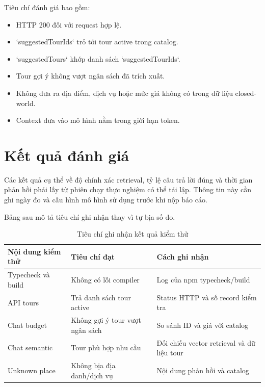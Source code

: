 Tiêu chí đánh giá bao gồm:
\begin{itemize}
    \item HTTP 200 đối với request hợp lệ.
    \item `suggestedTourIds` trỏ tới tour active trong catalog.
    \item `suggestedTours` khớp danh sách `suggestedTourIds`.
    \item Tour gợi ý không vượt ngân sách đã trích xuất.
    \item Không đưa ra địa điểm, dịch vụ hoặc mức giá không có trong dữ liệu closed-world.
    \item Context đưa vào mô hình nằm trong giới hạn token.
\end{itemize}

\section{Kết quả đánh giá}
Các kết quả cụ thể về độ chính xác retrieval, tỷ lệ câu trả lời đúng và thời gian phản hồi phải lấy từ phiên chạy thực nghiệm có thể tái lập. Thông tin này cần ghi ngày đo và cấu hình mô hình sử dụng trước khi nộp báo cáo.

Bảng sau mô tả tiêu chí ghi nhận thay vì tự bịa số đo.

\begin{table}[H]
\centering
\caption{Tiêu chí ghi nhận kết quả kiểm thử}
\label{tab:kiem-thu}
\begin{tabular}{|p{3.2cm}|p{4.2cm}|p{5.2cm}|}
\hline
\textbf{Nội dung kiểm thử} & \textbf{Tiêu chí đạt} & \textbf{Cách ghi nhận} \\
\hline
Typecheck và build & Không có lỗi compiler & Log của npm typecheck/build \\
\hline
API tours & Trả danh sách tour active & Status HTTP và số record kiểm tra \\
\hline
Chat budget & Không gợi ý tour vượt ngân sách & So sánh ID và giá với catalog \\
\hline
Chat semantic & Tour phù hợp nhu cầu & Đối chiếu vector retrieval và dữ liệu tour \\
\hline
Unknown place & Không bịa địa danh/dịch vụ & Nội dung phản hồi và catalog \\
\hline
\end{tabular}
\end{table}
